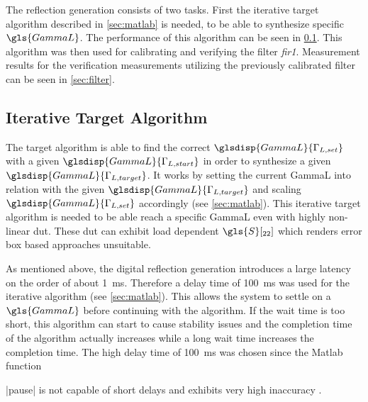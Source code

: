 \documentclass[12pt,a4paper,parskip=full,abstract=true,BCOR=12mm,twoside,open=right]{scrreprt}
\newcommand*{\SavedLstInline}{}
\DeclareRobustCommand*{\lstinline}{%
  \ifmmode
    \let\SavedBGroup\bgroup
    \def\bgroup{%
      \let\bgroup\SavedBGroup
      \hbox\bgroup
    }%
  \fi
  \SavedLstInline
}
\def\device#1{\mbox{\textit{#1}}}
\begin{document}
The reflection generation consists of two tasks. First the iterative target algorithm
described in \cref{sec:matlab} is needed, to be able to synthesize specific $\gls{GammaL}$.
The performance of this algorithm can be seen in \cref{sec:iterative}. This
algorithm was then used for calibrating and verifying the filter \device{fir1}. Measurement
results for the verification measurements utilizing the previously calibrated filter can be seen in \cref{sec:filter}.

\subsection{Iterative Target Algorithm}
\label{sec:iterative}

The target algorithm is able to find the correct $\glsdisp{GammaL}{\Gamma_{L,set}}$
with a given $\glsdisp{GammaL}{\Gamma_{L,start}}$ in order to synthesize a given
$\glsdisp{GammaL}{\Gamma_{L,target}}$. It works by setting the current \gls{GammaL}
into relation with the given $\glsdisp{GammaL}{\Gamma_{L,target}}$ and scaling
$\glsdisp{GammaL}{\Gamma_{L,set}}$ accordingly (see \cref{sec:matlab}). This
iterative target algorithm is needed to be able reach a specific \gls{GammaL} even
with highly non-linear \gls{dut}. These \gls{dut} can exhibit load dependent
$\gls{S}[_{22}]$ which renders error box based approaches unsuitable.

As mentioned above, the digital reflection generation introduces a large latency
on the order of about \SI{1}{\milli\second}. Therefore a delay time of \SI{100}{\milli\second}
was used for the iterative algorithm (see \cref{sec:matlab}). This allows the system to settle
on a $\gls{GammaL}$ before continuing with the algorithm. If the wait time is too short,
this algorithm can start to cause stability issues and the completion time of the algorithm
actually increases while a long wait time increases the completion time. The high delay
time of \SI{100}{\milli\second} was chosen since the Matlab function \lstinline|pause| is
not capable of short delays and exhibits very high inaccuracy \cite{matlab_pause}.
\end{document}
